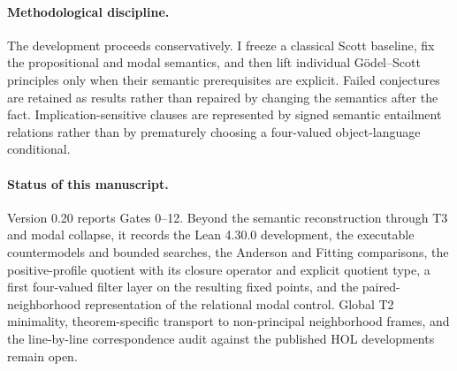 \paragraph{Methodological discipline.}
The development proceeds conservatively. I freeze a classical Scott baseline, fix the propositional and modal semantics, and then lift individual G\"odel--Scott principles only when their semantic prerequisites are explicit. Failed conjectures are retained as results rather than repaired by changing the semantics after the fact. Implication-sensitive clauses are represented by signed semantic entailment relations rather than by prematurely choosing a four-valued object-language conditional.

\paragraph{Status of this manuscript.}
Version 0.20 reports Gates 0--12. Beyond the semantic reconstruction through T3 and modal collapse, it records the Lean 4.30.0 development, the executable countermodels and bounded searches, the Anderson and Fitting comparisons, the positive-profile quotient with its closure operator and explicit quotient type, a first four-valued filter layer on the resulting fixed points, and the paired-neighborhood representation of the relational modal control. Global T2 minimality, theorem-specific transport to non-principal neighborhood frames, and the line-by-line correspondence audit against the published HOL developments remain open.

